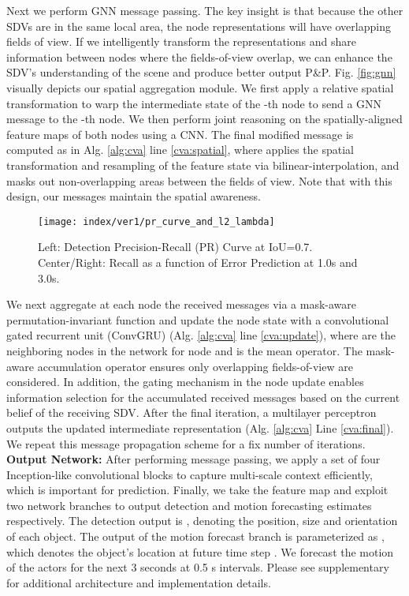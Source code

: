 \documentclass[runningheads]{llncs}
\newcommand{\pnp}{P\&P}
\begin{document}
Next we perform GNN message passing.
The key insight is that because the other SDVs are in the same local area, the node representations will have overlapping fields of view.
If we intelligently transform the representations and share information between nodes where the fields-of-view overlap, we can enhance the SDV's understanding of the scene and produce better output \pnp. Fig. \ref{fig:gnn} visually depicts our spatial aggregation module. 
We first apply a relative spatial transformation  to warp the intermediate state of the -th  node
to send a GNN message to the -th node.
We then perform joint reasoning on the spatially-aligned feature maps of both nodes using a CNN.
The final modified message is computed as in Alg. \ref{alg:cva} line \ref{cva:spatial}, 
where  applies the spatial transformation and resampling of the feature state via bilinear-interpolation, and   masks out non-overlapping areas between the fields of view.
Note that with this design, our messages maintain the spatial awareness.
\begin{figure}[t]
  \centering
  \texttt{[image: index/ver1/pr\_curve\_and\_l2\_lambda]}
\caption{Left: Detection Precision-Recall (PR) Curve at IoU=0.7. Center/Right: Recall as a function of  Error Prediction at 1.0s and 3.0s.}
  \label{fig:pr_curve_and_l2_lambda}
\end{figure}

We next aggregate at each node the received messages via a mask-aware permutation-invariant function 
and update the node state with a convolutional gated recurrent unit (ConvGRU) (Alg. \ref{alg:cva} line \ref{cva:update}), where  are the neighboring nodes in the network for node  and  is the mean operator. The mask-aware accumulation operator ensures only
overlapping fields-of-view
are considered.
In addition, the gating mechanism in the node update enables information selection for the accumulated received messages based on the current belief of the receiving SDV.
After the final iteration, a multilayer perceptron outputs the updated intermediate representation (Alg. \ref{alg:cva}  Line \ref{cva:final}). We repeat this message propagation scheme for a fix number of iterations.
{\flushleft\bf Output Network:}
\label{sec:output}
After performing message passing, we apply a set of four Inception-like \cite{szegedy2015going} convolutional blocks  to capture multi-scale context  efficiently, which is important for prediction.
Finally, we take the feature map and exploit two network branches to output detection and motion forecasting estimates respectively. The detection output  is  ,  denoting the position, size and orientation of each object. The output of the motion forecast branch is parameterized as , which denotes the object's location at future time step .
We forecast the motion of the actors for the next 3 seconds at 0.5 s intervals. 
Please see supplementary for additional architecture  and implementation details.
\end{document}
